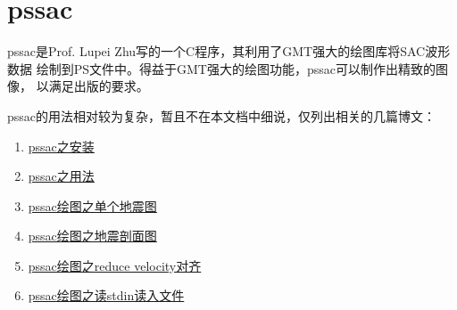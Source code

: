 \section{pssac}
\label{sec:pssac}

pssac是Prof. Lupei Zhu写的一个C程序，其利用了GMT强大的绘图库将SAC波形数据
绘制到PS文件中。得益于GMT强大的绘图功能，pssac可以制作出精致的图像，
以满足出版的要求。

pssac的用法相对较为复杂，暂且不在本文档中细说，仅列出相关的几篇博文：
\begin{enumerate}
\item \href{http://seisman.info/install-pssac.html}{pssac之安装}
\item \href{http://seisman.info/usage-of-pssac.html}{pssac之用法}
\item \href{http://seisman.info/plot-single-trace-with-pssac.html}{pssac绘图之单个地震图}
\item \href{http://seisman.info/plot-profile-with-pssac.html}{pssac绘图之地震剖面图}
\item \href{http://seisman.info/reduce-velocity-alignment-with-pssac.html}{pssac绘图之reduce velocity对齐}
\item \href{http://seisman.info/read-files-from-stdin-with-pssac.html}{pssac绘图之读stdin读入文件}
\end{enumerate}



